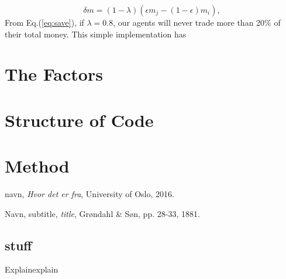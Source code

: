 \documentclass[10pt, a4paper]{article}
\begin{document}
\begin{equation}\label{eq:save}
  \delta m=(1-\lambda)(\epsilon m_j-(1-\epsilon)m_i),
\end{equation}
From Eq.(\ref{eq:save}), if $\lambda = 0.8$, our agents will never trade more than 20\% of their total money. 
This simple implementation has 
\section{The Factors}

\section{Structure of Code}
\section{Method}


\begin{thebibliography}{9}

	navn,
	\emph{Hvor det er fra},
	University of Oslo,
	2016.
	
	Navn,
	subtitle,
	\emph{title},
	Grøndahl \& Søn, pp. 28-33,
	1881.

\end{thebibliography}

\begin{appendix}
\section{stuff}
\label{app1}
Explainexplain

\end{appendix}
\end{document}
